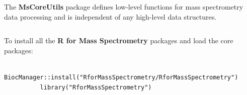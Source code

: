 \documentclass[final]{beamer}
\newcommand{\bpkg}[1]{{\textbf{#1}}}
\begin{document}
\begin{frame}[fragile]
\begin{columns}[T]
\begin{column}{.4\textwidth}
      \vspace{1cm}

      \begin{block}{}
        \justifying The \bpkg{MsCoreUtils} package defines low-level
        functions for mass spectrometry data processing and is
        independent of any high-level data structures.
      \end{block}


    \end{column}

  \end{columns}

  \begin{columns}

    \begin{column}{.7\textwidth}

      \vspace{2cm}

      \begin{block}{}
        To install all the \textbf{R for Mass Spectrometry} packages
        and load the core packages:

        \vspace{5mm}

        \begin{lstlisting}
          BiocManager::install("RforMassSpectrometry/RforMassSpectrometry")
          library("RforMassSpectrometry")
        \end{lstlisting}

      \end{block}
    \end{column}
    \begin{column}{.2\textwidth}
    \end{column}
  \end{columns}

  \vfill


\end{frame}
\end{document}
